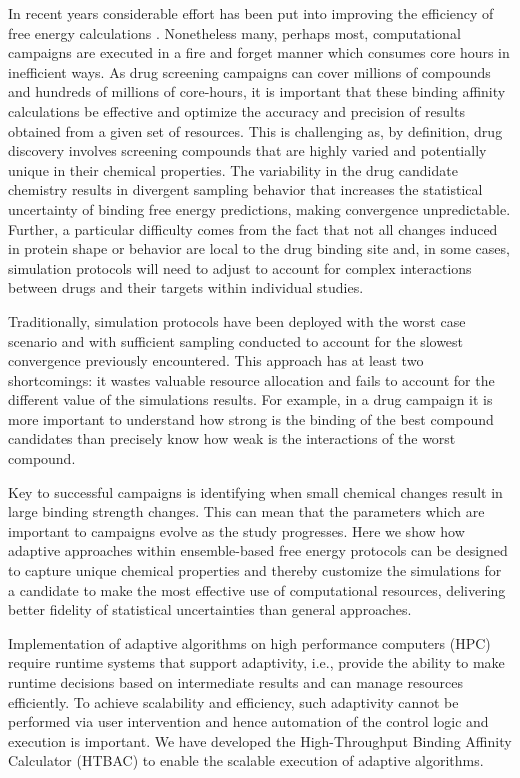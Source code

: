 In recent years considerable effort has been put into improving the efficiency 
of free energy calculations \cite{Klimovich2015, Naden2016, Kaus2013}.
Nonetheless many, perhaps most, computational campaigns are executed in a fire 
and forget manner which consumes core hours in inefficient ways.
As drug screening campaigns can cover millions of compounds and
hundreds of millions of core-hours, it is important that these binding
affinity calculations be effective and optimize the accuracy and precision of
results obtained from a given set of resources. This is challenging as, by
definition, drug discovery involves screening compounds that are highly
varied and potentially unique in their chemical properties. The variability
in the drug candidate chemistry results in divergent sampling behavior that
increases the statistical uncertainty of binding free energy predictions,
making convergence unpredictable. Further, a particular difficulty comes from
the fact that not all changes induced in protein shape or behavior are local
to the drug binding site and, in some cases, simulation protocols will need
to adjust to account for complex interactions between drugs and their targets
within individual studies.

Traditionally, simulation protocols have been deployed with the worst case
scenario and with sufficient sampling conducted to account for the
slowest convergence previously encountered. This approach has at least two
shortcomings: it wastes valuable resource allocation and fails to account
for the different value of the simulations results. For example, in a drug
campaign it is more important to understand how strong is the binding of the
best compound candidates than precisely know how weak is the interactions
of the worst compound.

Key to successful campaigns is identifying when small chemical changes result
in large binding strength changes. This can mean that the parameters which
are important to campaigns evolve as the study progresses. Here we show how
adaptive approaches within ensemble-based free energy protocols can be
designed to capture unique chemical properties and thereby customize the
simulations for a candidate to make the most effective use of computational
resources, delivering better fidelity of statistical uncertainties than
general approaches.

Implementation of adaptive algorithms on high performance computers (HPC)
require runtime systems that support adaptivity, i.e., provide the ability to
make runtime decisions based on intermediate results and can manage resources
efficiently. To achieve scalability and efficiency, such adaptivity cannot be
performed via user intervention and hence automation of the control logic and
execution is important. We have developed the High-Throughput Binding
Affinity Calculator (HTBAC) to enable the scalable execution of adaptive
algorithms.

